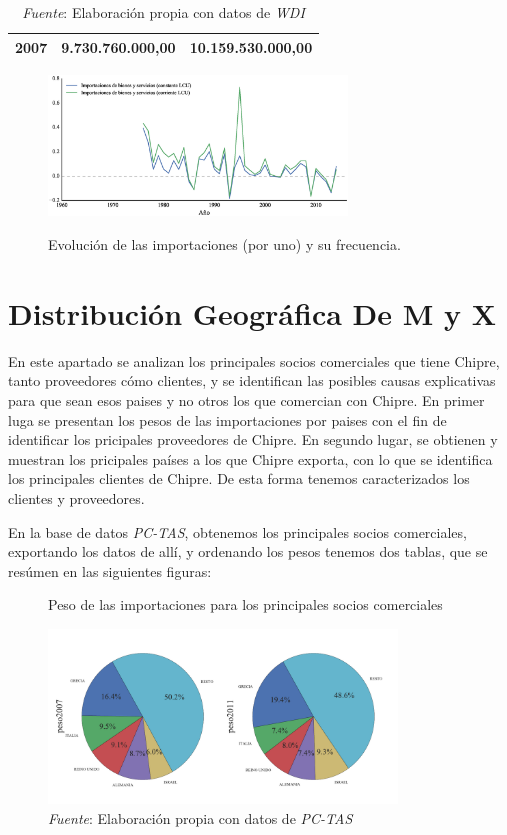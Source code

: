 \documentclass[a4paper,openright,12pt]{book}
\begin{document}
\begin{table}[]
\begin{tabular}{@{}lll@{}}
2007 & 9.730.760.000,00                                                                                                      & 10.159.530.000,00                                                                                                     \\ \bottomrule
\end{tabular}
\caption*{\textit{Fuente}: Elaboración propia con datos de \textit{WDI}}
\end{table}


\begin{figure}[ht]
    \caption{Evolución de las importaciones (por uno) y su frecuencia.}
    \centering
    \includegraphics[width=300px]{ev_m}
    \label{ev_m}
\end{figure}


\chapter{Distribución Geográfica De M y X}
\label{cap3}

En este apartado se analizan los principales socios comerciales que tiene Chipre, tanto proveedores cómo clientes, y se identifican las posibles causas explicativas para que sean esos paises y no otros los que comercian con Chipre. En primer luga se presentan los pesos de las importaciones por paises con el fin de identificar los pricipales proveedores de Chipre. En segundo lugar, se obtienen y muestran los pricipales países a los que Chipre exporta, con lo que se identifica los principales clientes de Chipre. De esta forma tenemos caracterizados los clientes y proveedores.

En la base de datos \textit{PC-TAS}, obtenemos los principales socios comerciales, exportando los datos de allí, y ordenando los pesos tenemos dos tablas, que se resúmen en las siguientes figuras:

\begin{figure}[ht]
    \centering
    \caption{Peso de las importaciones para los principales socios comerciales}
    \includegraphics[width=350px]{pie_mgeo.pdf}
    \caption*{\textit{Fuente}: Elaboración propia con datos de \textit{PC-TAS}}
    \label{pie_mgeo}
\end{figure}
\end{document}

